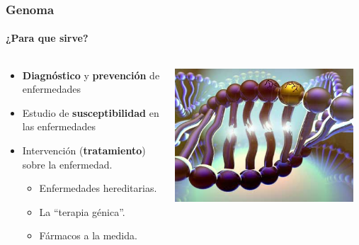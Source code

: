 \begin{frame}
\frametitle{Genoma}
\framesubtitle{¿Para que sirve?}
\begin{columns}
\begin{column}{0.7\textwidth}
\begin{itemize}
    \item \textbf{Diagnóstico} y \textbf{prevención} de enfermedades\\
    \item Estudio de \textbf{susceptibilidad} en las enfermedades
    \item Intervención (\textbf{tratamiento}) sobre la enfermedad.
    \begin{itemize}
        \item Enfermedades hereditarias.
        \item La ``terapia génica''.
        \item Fármacos a la medida.
    \end{itemize}
\end{itemize}
\end{column}
\begin{column}{0.3\textwidth}
	\includegraphics[width=0.95\textwidth]{img/autismo.jpg}
\end{column}
\end{columns}
\end{frame}

